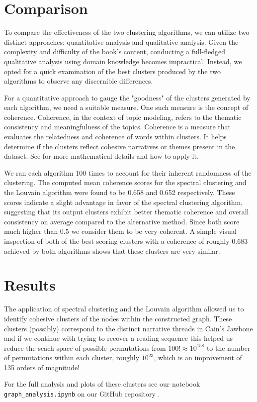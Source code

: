 \documentclass[a4paper]{article}
\begin{document}
\section{Comparison}

To compare the effectiveness of the two clustering algorithms, we can utilize two distinct approaches: quantitative analysis and qualitative analysis. Given the complexity and difficulty of the book's content, conducting a full-fledged qualitative analysis using domain knowledge becomes impractical. Instead, we opted for a quick examination of the best clusters produced by the two algorithms to observe any discernible differences.

For a quantitative approach to gauge the "goodness" of the clusters generated by each algorithm, we need a suitable measure. One such measure is the concept of coherence. Coherence, in the context of topic modeling, refers to the thematic consistency and meaningfulness of the topics. Coherence is a measure that evaluates the relatedness and coherence of words within clusters. It helps determine if the clusters reflect cohesive narratives or themes present in the dataset. See \cite{coherence} for more mathematical details and how to apply it.

We ran each algorithm 100 times to account for their inherent randomness of the clustering. The computed mean coherence scores for the spectral clustering and the Louvain algorithm were found to be 0.658 and 0.652 respectively. These scores indicate a slight advantage in favor of the spectral clustering algorithm, suggesting that its output clusters exhibit better thematic coherence and overall consistency on average compared to the alternative method. Since both score much higher than 0.5 we consider them to be very coherent. A simple visual inspection of both of the best scoring clusters with a coherence of roughly 0.683 achieved by both algorithms shows that these clusters are very similar.


\section{Results}

The application of spectral clustering and the Louvain algorithm allowed us to identify cohesive clusters of the nodes within the constructed graph. These clusters (possibly) correspond to the distinct narrative threads in Cain's Jawbone and if we continue with trying to recover a reading sequence this helped us reduce the seach space of possible permutations from $100! \approx 10^{158}$ to the number of permutations within each cluster, roughly $10^{23}$, which is an improvement of 135 orders of magnitude!

For the full analysis and plots of these clusters see our notebook \\ \verb|graph_analysis.ipynb| on our GitHub repository \cite{github}.


\printbibliography
\end{document}
